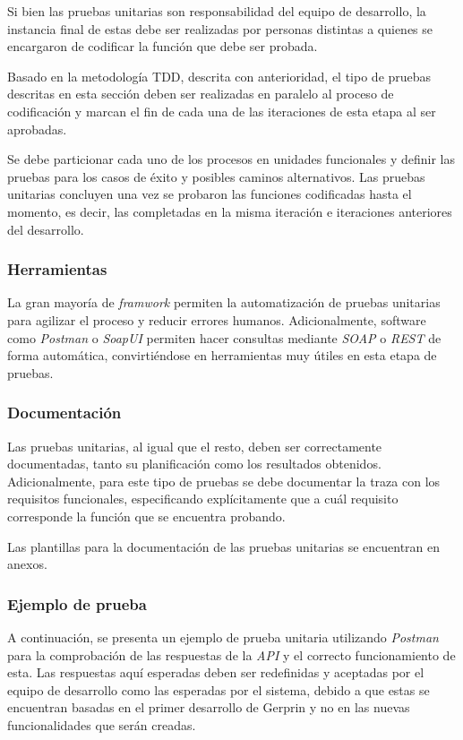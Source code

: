 Si bien las pruebas unitarias son responsabilidad del equipo de desarrollo, la instancia final de estas debe ser realizadas por personas distintas a quienes se encargaron de codificar la función que debe ser probada.

Basado en la metodología TDD, descrita con anterioridad, el tipo de pruebas descritas en esta sección deben ser realizadas en paralelo al proceso de codificación y marcan el fin de cada una de las iteraciones de esta etapa al ser aprobadas.

Se debe particionar cada uno de los procesos en unidades funcionales y definir las pruebas para los casos de éxito y posibles caminos alternativos. Las pruebas unitarias concluyen una vez se probaron las funciones codificadas hasta el momento, es decir, las completadas en la misma iteración e iteraciones anteriores del desarrollo. 


\subsubsection{Herramientas}

La gran mayoría de \textit{framwork} permiten la automatización de pruebas unitarias para agilizar el proceso y reducir errores humanos. Adicionalmente, software como \textit{Postman} o \textit{SoapUI} permiten hacer consultas mediante \textit{SOAP} o \textit{REST} de forma automática, convirtiéndose en herramientas muy útiles en esta etapa de pruebas.

\subsubsection{Documentación}

Las pruebas unitarias, al igual que el resto, deben ser correctamente documentadas, tanto su planificación como los resultados obtenidos. Adicionalmente, para este tipo de pruebas se debe documentar la traza con los requisitos funcionales, especificando explícitamente que a cuál requisito corresponde la función que se encuentra probando.

Las plantillas para la documentación de las pruebas unitarias se encuentran en anexos.

\subsubsection{Ejemplo de prueba}

A continuación, se presenta un ejemplo de prueba unitaria utilizando \textit{Postman} para la comprobación de las respuestas de la \textit{API} y el correcto funcionamiento de esta. Las respuestas aquí esperadas deben ser redefinidas y aceptadas por el equipo de desarrollo como las esperadas por el sistema, debido a que estas se encuentran basadas en el primer desarrollo de Gerprin y no en las nuevas funcionalidades que serán creadas.

